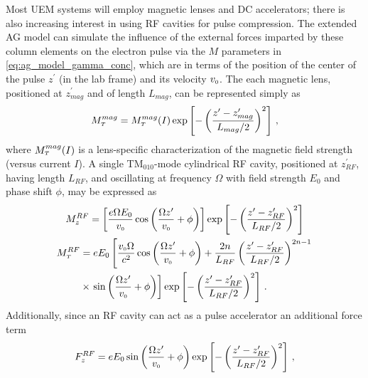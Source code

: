 Most UEM systems will employ magnetic lenses and DC accelerators; there is also increasing interest in using RF cavities for pulse compression.
The extended AG model can simulate the influence of the external forces imparted by these column elements on the electron pulse via the $M$ parameters in \ref{eq:ag_model_gamma_conc}, which are in terms of the position of the center of the pulse $z^{\prime}$ (in the lab frame) and its velocity $v_{{\scriptscriptstyle 0}}$.
The each magnetic lens, positioned at $z_{mag}^{\prime}$ and of length $L_{mag}$, can be represented simply as 
\begin{equation}
  M_{{\scriptscriptstyle T}}^{mag} = M_{{\scriptscriptstyle T}}^{mag}(I) \exp \left [ - \left (  \frac{ z^{\prime} - z_{mag}^{\prime} }{ L_{mag} / 2 } \right )^{ 2 } \right ] \,\text{,}
\end{equation}
where $M_{{\scriptscriptstyle T}}^{mag}(I)$ is a lens-specific characterization of the magnetic field strength (versus current $I$).
A single TM$_{010}$-mode cylindrical RF cavity, positioned at $z_{RF}^{\prime}$, having length $L_{RF}$, and oscillating at frequency $\Omega$ with field strength $E_{0}$ and phase shift $\phi$, may be expressed as
\begin{gather}
  M_{z}^{RF} = \left [ \frac{ e \Omega E_{0} }{ v_{{\scriptscriptstyle 0}} } \cos \left ( \frac{ \Omega z^{\prime} }{ v_{{\scriptscriptstyle 0}} } + \phi \right ) \right ] \exp \left [ - \left (  \frac{ z^{\prime} - z_{RF}^{\prime} }{ L_{RF} / 2 } \right )^{ 2 } \right ] \\
  \begin{aligned}
  M_{{\scriptscriptstyle T}}^{RF} &= e E_{0} \left [ \frac{ v_{{\scriptscriptstyle 0}} \Omega }{c^{2}} \cos \left ( \frac{ \Omega z^{\prime} }{ v_{{\scriptscriptstyle 0}} } + \phi \right ) + \frac{2 n}{L_{RF}} \left ( \frac{z^{\prime} - z^{\prime}_{RF}}{L_{RF} / 2} \right )^{2 n - 1} \right. \\ & \times \left. \sin \left ( \frac{ \Omega z^{\prime} }{ v_{{\scriptscriptstyle 0}} } + \phi \right )
   \right ] \exp \left [ - \left (  \frac{ z^{\prime} - z_{RF}^{\prime} }{ L_{RF} / 2 } \right )^{ 2 } \right ] \,\text{.}
  \end{aligned}
\end{gather}
Additionally, since an RF cavity can act as a pulse accelerator an additional force term
\begin{equation}
  F_{z}^{RF} = e E_{0} \sin \left ( \frac{ \Omega z^{\prime} }{ v_{{\scriptscriptstyle 0}} } + \phi \right ) \exp \left [ - \left (  \frac{ z^{\prime} - z_{RF}^{\prime} }{ L_{RF} / 2 } \right )^{ 2 } \right ] \, \text{,}
\end{equation}
